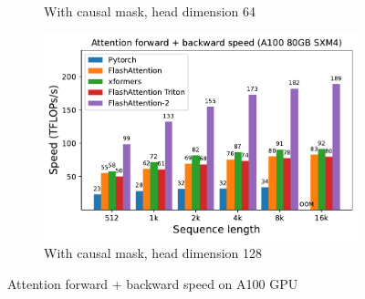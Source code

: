 \begin{figure}[ht]
\begin{subfigure}{.5\textwidth}
    \caption{With causal mask, head dimension 64}
  \end{subfigure}%
  \begin{subfigure}{.5\textwidth}
    \centering
    \includegraphics[width=.95\linewidth]{figs/flash2_causal_True_hdim_128_fwd_bwd_speed.pdf}
    \caption{With causal mask, head dimension 128}
  \end{subfigure}
  \caption{Attention forward + backward speed on A100 GPU}
  \label{fig:benchmark_attn_fwd_bwd}
\end{figure}

